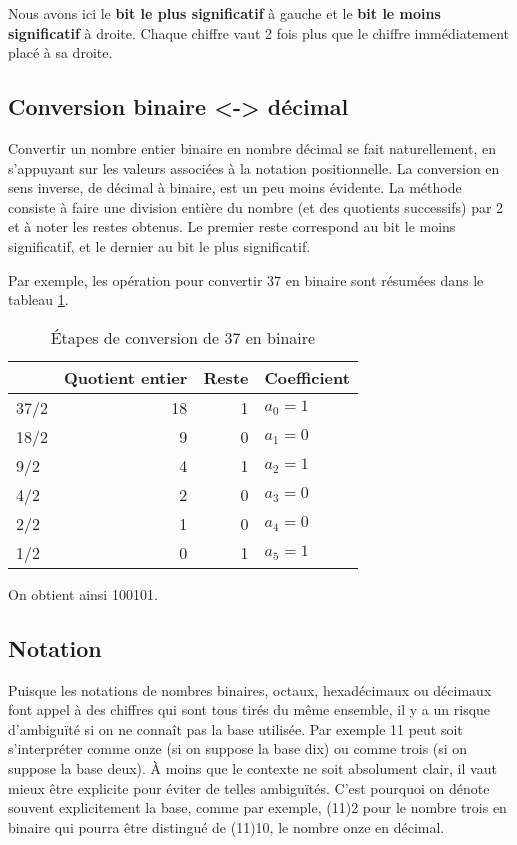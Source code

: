 \documentclass[11pt]{article}
\begin{document}
Nous avons ici le \textbf{bit le plus significatif} à gauche et le \textbf{bit le
moins significatif} à droite. Chaque chiffre vaut 2 fois plus que le
chiffre immédiatement placé à sa droite.

\subsection{Conversion binaire <-> décimal}
\label{sec:orgd42b8f4}

Convertir un nombre entier binaire en nombre décimal se fait
naturellement, en s'appuyant sur les valeurs associées à la notation
positionnelle. La conversion en sens inverse, de décimal à binaire,
est un peu moins évidente. La méthode consiste à faire une division
entière du nombre (et des quotients successifs) par 2 et à noter les
restes obtenus. Le premier reste correspond au bit le moins
significatif, et le dernier au bit le plus significatif.

Par exemple, les opération pour convertir 37 en binaire sont résumées
dans le tableau \ref{tab:orga54a80a}.

\begin{table}[htbp]
\caption{\label{tab:orga54a80a}Étapes de conversion de 37 en binaire}
\centering
\begin{tabular}{lrrl}
 & Quotient entier & Reste & Coefficient\\
\hline
37/2 & 18 & 1 & \(a_0 = 1\)\\
18/2 & 9 & 0 & \(a_1 = 0\)\\
9/2 & 4 & 1 & \(a_2 = 1\)\\
4/2 & 2 & 0 & \(a_3 = 0\)\\
2/2 & 1 & 0 & \(a_4 = 0\)\\
1/2 & 0 & 1 & \(a_5 = 1\)\\
\end{tabular}
\end{table}

On obtient ainsi 100101.

\subsection{Notation}
\label{sec:org8547f34}

Puisque les notations de nombres binaires, octaux, hexadécimaux ou
décimaux font appel à des chiffres qui sont tous tirés du même
ensemble, il y a un risque d’ambiguïté si on ne connaît pas la base
utilisée. Par exemple 11 peut soit s'interpréter comme onze (si on
suppose la base dix) ou comme trois (si on suppose la base deux). À
moins que le contexte ne soit absolument clair, il vaut mieux être
explicite pour éviter de telles ambiguïtés. C'est pourquoi on dénote
souvent explicitement la base, comme par exemple, (11)2 pour le nombre
trois en binaire qui pourra être distingué de (11)10, le nombre onze
en décimal.
\end{document}
